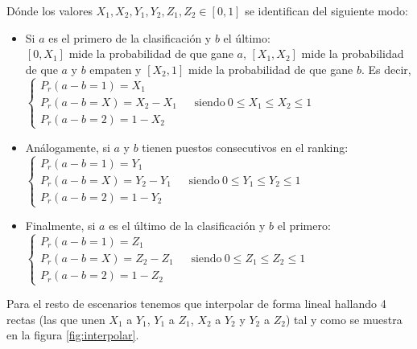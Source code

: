 Dónde los valores $X_{1},X_{2},Y_{1},Y_{2},Z_{1},Z_{2} \in [0,1]$ se identifican del siguiente modo:
\begin{itemize}
	\item Si $a$ es el primero de la clasificación y $b$ el último:\\
	 $[0,X_{1}]$ mide la probabilidad de que gane $a$, $[X_{1},X_{2}]$ mide la probabilidad de que $a$ y $b$ empaten y $[X_{2},1]$ mide la probabilidad de que gane $b$.
	 Es decir,\\
	 
	 $\begin{cases}
	 	P_{r}(a-b=1)=X_{1}\\
	 	P_{r}(a-b=X)=X_{2}-X_{1} \ \ \ \ \ \ \ \text{siendo} \ 0 \leq X_{1} \leq X_{2} \leq 1\\
	 	P_{r}(a-b=2)=1-X_{2} 
	 \end{cases}$\\
	 
	\item Análogamente, si $a$ y $b$ tienen puestos consecutivos en el ranking:\\
	
	$\begin{cases}
	P_{r}(a-b=1)=Y_{1}\\
	P_{r}(a-b=X)=Y_{2}-Y_{1} \ \ \ \ \ \ \ \text{siendo} \ 0 \leq Y_{1} \leq Y_{2} \leq 1\\
	P_{r}(a-b=2)=1-Y_{2} 
	\end{cases}$\\
	
	\item Finalmente, si $a$ es el último de la clasificación y $b$ el primero:\\
	
	$\begin{cases}
	P_{r}(a-b=1)=Z_{1}\\
	P_{r}(a-b=X)=Z_{2}-Z_{1} \ \ \ \ \ \ \ \text{siendo} \ 0 \leq Z_{1} \leq Z_{2} \leq 1\\
	P_{r}(a-b=2)=1-Z_{2} 
	\end{cases}$
\end{itemize}

Para el resto de escenarios tenemos que interpolar de forma lineal hallando 4 rectas (las que unen $X_{1}$ a $Y_{1}$, $Y_{1}$ a $Z_{1}$, $X_{2}$ a $Y_{2}$ y $Y_{2}$ a $Z_{2}$) tal y como se muestra en la figura \ref{fig:interpolar}.

